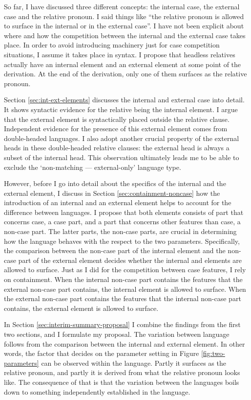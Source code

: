 So far, I have discussed three different concepts: the internal case, the external case and the relative pronoun. I said things like ``the relative pronoun is allowed to surface in the internal or in the external case''. I have not been explicit about where and how the competition between the internal and the external case takes place. In order to avoid introducing machinery just for case competition situations, I assume it takes place in syntax. I propose that headless relatives actually have an internal element and an external element at some point of the derivation. At the end of the derivation, only one of them surfaces as the relative pronoun.

Section \ref{sec:int-ext-elements} discusses the internal and external case into detail. It shows syntactic evidence for the relative being the internal element. I argue that the external element is syntactically placed outside the relative clause. Independent evidence for the presence of this external element comes from double-headed languages. I also adopt another crucial property of the external heads in these double-headed relative clauses: the external head is always a subset of the internal head. This observation ultimately leads me to be able to exclude the `non-matching --- external-only' language type.

However, before I go into detail about the specifics of the internal and the external element, I discuss in Section \ref{sec:containment-noncase} how the introduction of an internal and an external element helps to account for the difference between languages. I propose that both elements consists of part that concerns case, a case part, and a part that concerns other features than case, a non-case part. The latter parts, the non-case parts, are crucial in determining how the language behaves with the respect to the two parameters. Specifically, the comparison between the non-case part of the internal element and the non-case part of the external element decides whether the internal and elements are allowed to surface. Just as I did for the competition between case features, I rely on containment. When the internal non-case part contains the features that the external non-case part contains, the internal element is allowed to surface. When the external non-case part contains the features that the internal non-case part contains, the external element is allowed to surface.

In Section \ref{sec:interim-summary-proposal} I combine the findings from the first two sections, and I formulate my proposal. The variation between language follows from the comparison between the internal and external element. In other words, the factor that decides on the parameter setting in Figure \ref{fig:two-parameters} can be observed within the language. Partly it surfaces as the relative pronoun, and partly it is derived from what the relative pronoun looks like. The consequence of that is that the variation between the languages boils down to something independently established in the language.

